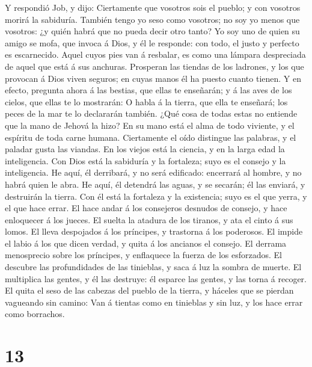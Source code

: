  Y respondió Job, y dijo:  Ciertamente que
vosotros sois el pueblo; y con vosotros morirá la sabiduría.
 También tengo yo seso como vosotros; no soy yo menos que
vosotros: ¿y quién habrá que no pueda decir otro tanto? 
Yo soy uno de quien su amigo se mofa, que invoca á Dios, y él le
responde: con todo, el justo y perfecto es escarnecido. 
Aquel cuyos pies van á resbalar, es como una lámpara despreciada de
aquel que está á sus anchuras.  Prosperan las tiendas de
los ladrones, y los que provocan á Dios viven seguros; en cuyas manos él
ha puesto cuanto tienen.  Y en efecto, pregunta ahora á
las bestias, que ellas te enseñarán; y á las aves de los cielos, que
ellas te lo mostrarán:  O habla á la tierra, que ella te
enseñará; los peces de la mar te lo declararán también. 
¿Qué cosa de todas estas no entiende que la mano de Jehová la hizo?
 En su mano está el alma de todo viviente, y el espíritu
de toda carne humana.  Ciertamente el oído distingue las
palabras, y el paladar gusta las viandas.  En los viejos
está la ciencia, y en la larga edad la inteligencia.  Con
Dios está la sabiduría y la fortaleza; suyo es el consejo y la
inteligencia.  He aquí, él derribará, y no será
edificado: encerrará al hombre, y no habrá quien le abra.
 He aquí, él detendrá las aguas, y se secarán; él las
enviará, y destruirán la tierra.  Con él está la
fortaleza y la existencia; suyo es el que yerra, y el que hace errar.
 El hace andar á los consejeros desnudos de consejo, y
hace enloquecer á los jueces.  El suelta la atadura de
los tiranos, y ata el cinto á sus lomos.  El lleva
despojados á los príncipes, y trastorna á los poderosos. 
El impide el labio á los que dicen verdad, y quita á los ancianos el
consejo.  El derrama menosprecio sobre los príncipes, y
enflaquece la fuerza de los esforzados.  El descubre las
profundidades de las tinieblas, y saca á luz la sombra de muerte.
 El multiplica las gentes, y él las destruye: él esparce
las gentes, y las torna á recoger.  El quita el seso de
las cabezas del pueblo de la tierra, y háceles que se pierdan vagueando
sin camino:  Van á tientas como en tinieblas y sin luz, y
los hace errar como borrachos.

\hypertarget{section-12}{%
\section{13}\label{section-12}}

